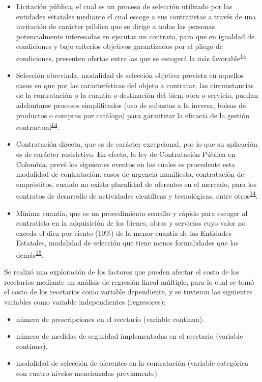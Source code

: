 \documentclass[
]{book}
\begin{document}
\begin{itemize}
\item
  Licitación pública, el cual es un proceso de selección utilizado por las entidades estatales mediante el cual escoge a sus contratistas a través de una invitación de carácter público que se dirige a todas las personas potencialmente interesadas en ejecutar un contrato, para que en igualdad de condiciones y bajo criterios objetivos garantizados por el pliego de condiciones, presenten ofertas entre las que se escogerá la más favorable\textsuperscript{\protect\hyperlink{ref-MinisteriodeRelacionesExteriores2014}{14}}.
\item
  Selección abreviada, modalidad de selección objetiva prevista en aquellos casos en que por las características del objeto a contratar, las circunstancias de la contratación o la cuantía o destinación del bien, obra o servicio, puedan adelantarse procesos simplificados (uso de subastas a la inversa, bolsas de productos o compras por catálogo) para garantizar la eficacia de la gestión contractual\textsuperscript{\protect\hyperlink{ref-MinisteriodeRelacionesExteriores2014}{14}}.
\item
  Contratación directa, que es de carácter excepcional, por lo que su aplicación es de carácter restrictivo. En efecto, la ley de Contratación Pública en Colombia, prevé los siguientes eventos en los cuales es procedente esta modalidad de contratación: casos de urgencia manifiesta, contratación de empréstitos, cuando no exista pluralidad de oferentes en el mercado, para los contratos de desarrollo de actividades científicas y tecnológicas, entre otros\textsuperscript{\protect\hyperlink{ref-MinisteriodeRelacionesExteriores2014}{14}}.
\item
  Mínima cuantía, que es un procedimiento sencillo y rápido para escoger al contratista en la adquisición de los bienes, obras y servicios cuyo valor no exceda el diez por ciento (10\%) de la menor cuantía de las Entidades Estatales, modalidad de selección que tiene menos formalidades que las demás\textsuperscript{\protect\hyperlink{ref-ColombiaCompraEficiente2019}{15}}.
\end{itemize}

Se realizó una exploración de los factores que pueden afectar el costo de los recetarios mediante un análisis de regresión lineal múltiple, para lo cual se tomó el costo de los recetarios como variable dependiente, y se tuvieron las siguientes variables como variable independientes (regresores):

\begin{itemize}
\item
  número de prescripciones en el recetario (variable continua).
\item
  número de medidas de seguridad implementadas en el recetario (variable continua).
\item
  modalidad de selección de oferentes en la contratación (variable categórica con cuatro niveles mencionadas previamente)
\end{itemize}
\end{document}
